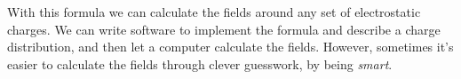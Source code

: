 With this formula we can calculate the fields around any set of electrostatic charges.
We can write software to implement the formula and describe a charge distribution,
and then let a computer calculate the fields.
However, sometimes it's easier to calculate the fields through clever guesswork,
by being \emph{smart}.

